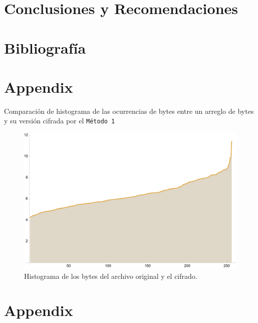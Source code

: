 \newpage
\section{Conclusiones y Recomendaciones}


\newpage
\section{Bibliografía}
\printbibliography[heading=none]

\newpage
\appendix

\section{Appendix}

Comparación de histograma de las ocurrencias de bytes entre un arreglo de bytes
y su versión cifrada por el \texttt{Método 1}

\begin{figure}[H]
    \centering
    \includegraphics[scale=0.7]{../img/historygram}
    \caption*{Histograma de los bytes del archivo
original y el cifrado.}\label{fig:d2}
\end{figure}

\newpage
\section{Appendix}

